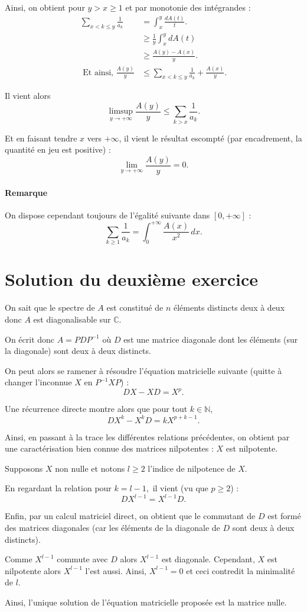 Ainsi, on obtient pour $y>x\geq 1$ et par monotonie des intégrandes :
\begin{align*} 
\sum_{x<k\leq y}\frac{1}{a_{k}} & =\int_{x}^{y}\frac{dA(t)}{t}.\\
& \geq \frac{1}{y}\int_{x}^{y}dA(t)\\
& \geq \frac{A(y)-A(x)}{y}.\\
\mbox{ Et ainsi, } \frac{A(y)}{y} & \leq \sum_{x<k\leq y}\frac{1}{a_{k}}+ \frac{A(x)}{y}.
\end{align*}

Il vient alors $$\limsup_{y\rightarrow +\infty}\frac{A(y)}{y} \leq \sum_{k>x}\frac{1}{a_{k}}.$$

Et en faisant tendre $x$ vers $+\infty$, il vient le résultat escompté (par encadrement, la quantité en jeu est positive) : $$\lim_{y\rightarrow +\infty}\frac{A(y)}{y}=0.$$

\paragraph{Remarque} %
On dispose cependant toujours de l'égalité suivante dans $[0,+\infty]$ :
\[
\sum_{k\geqslant 1} \frac1{a_k} = \int_0^{+\infty} \frac{A(x)}{x^2}\,dx.
\]

\section{Solution du deuxième exercice}

On sait que le spectre de $A$ est constitué de $n$ éléments distincts deux à deux donc $A$ est diagonalisable sur $\mathbb{C}.$

On écrit donc $A=PDP^{-1}$ où $D$ est une matrice diagonale dont les éléments (sur la diagonale) sont deux à deux distincts.

On peut alors se ramener à résoudre  l'équation matricielle suivante (quitte à changer l'inconnue $X$ en $P^{-1}XP$) : $$DX-XD=X^{p}.$$

Une récurrence directe montre alors que pour tout $k\in \mathbb{N},$ $$DX^{k}-X^{k}D=kX^{p+k-1}.$$

Ainsi, en passant à la trace les différentes relations précédentes, on obtient par une caractérisation bien connue des matrices nilpotentes : $X$ est nilpotente.

Supposons $X$ non nulle et notons $l\geq 2$ l'indice de nilpotence de $X.$

En regardant la relation pour $k=l-1,$ il vient (vu que $p\geq 2$) : $$DX^{l-1}=X^{l-1}D.$$

Enfin, par un calcul matriciel direct, on obtient que le commutant de $D$ est formé des matrices diagonales (car les éléments de la diagonale de $D$ sont deux à deux distincts).

Comme $X^{l-1}$ commute avec $D$ alors $X^{l-1}$ est diagonale. Cependant, $X$ est nilpotente alors $X^{l-1}$ l'est aussi. Ainsi, $X^{l-1}=0$ et ceci contredit la minimalité de $l.$

Ainsi, l'unique solution de l'équation matricielle proposée est la matrice nulle.